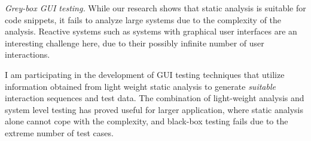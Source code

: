 \noindent\emph{Grey-box GUI testing.} While our research shows that static
analysis is suitable for code snippets, it fails to analyze large systems due
to the complexity of the analysis. Reactive systems such as systems with graphical
user interfaces are an interesting challenge here, due to their possibly infinite
number of user interactions.   

I am participating in the development of GUI testing techniques that
utilize information obtained from light weight static analysis to generate
\emph{suitable} interaction sequences and test data. The combination of
light-weight analysis and system level testing has proved useful for larger
application, where static analysis alone cannot cope with the complexity, and
black-box testing fails due to the extreme number of test cases.

